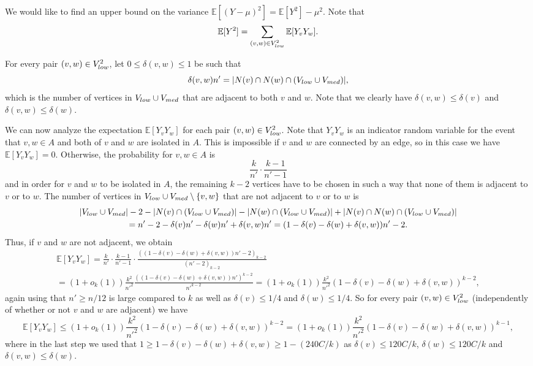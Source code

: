 \documentclass[11pt]{article}
\theoremstyle{definition}
\numberwithin{equation}{section}
\begin{document}
We would like to find an upper bound on the variance $\mathbb{E}[(Y-\mu)^2]=\mathbb{E}[Y^2]-\mu^2$. Note that
\[\mathbb{E}[Y^2]=\sum_{(v,w)\in V_{\textnormal{low}}^2}\mathbb{E}[Y_vY_w].\]

For every pair $(v,w)\in V_{\textnormal{low}}^2$, let $0\leq \delta(v,w)\leq 1$ be such that
\[\delta(v,w)n'=\vert N(v)\cap N(w)\cap (V_{\textnormal{low}}\cup V_{\textnormal{med}})\vert,\]
which is the number of vertices in $V_{\textnormal{low}}\cup V_{\textnormal{med}}$ that are adjacent to both $v$ and $w$. Note that we clearly have $\delta(v,w)\leq \delta(v)$ and $\delta(v,w)\leq \delta(w)$.

We can now analyze the expectation $\mathbb{E}[Y_vY_w]$ for each pair $(v,w)\in V_{\textnormal{low}}^2$. Note that $Y_vY_w$ is an indicator random variable for the event that $v,w\in A$ and both of $v$ and $w$ are isolated in $A$. This is impossible if $v$ and $w$ are connected by an edge, so in this case we have $\mathbb{E}[Y_vY_w]=0$. Otherwise, the probability for $v,w\in A$ is
\[\frac{k}{n'}\cdot \frac{k-1}{n'-1}\]
and in order for $v$ and $w$ to be isolated in $A$, the remaining $k-2$ vertices have to be chosen in such a way that none of them is adjacent to $v$ or to $w$. The number of vertices in $V_{\textnormal{low}}\cup V_{\textnormal{med}}\setminus \lbrace v,w\rbrace$ that are not adjacent to $v$ or to $w$ is
\begin{multline*}
\vert V_{\textnormal{low}}\cup V_{\textnormal{med}}\vert-2-\vert N(v)\cap (V_{\textnormal{low}}\cup V_{\textnormal{med}})\vert-\vert N(w)\cap (V_{\textnormal{low}}\cup V_{\textnormal{med}})\vert+\vert N(v)\cap N(w)\cap (V_{\textnormal{low}}\cup V_{\textnormal{med}})\vert\\
=n'-2-\delta(v)n'-\delta(w)n'+\delta(v,w)n'=(1-\delta(v)-\delta(w)+\delta(v,w))n'-2.
\end{multline*}
Thus, if $v$ and $w$ are not adjacent, we obtain
\begin{multline*}
\mathbb{E}[Y_vY_w]=\frac{k}{n'}\cdot \frac{k-1}{n'-1}\cdot \frac{((1-\delta(v)-\delta(w)+\delta(v,w))n'-2)_{k-2}}{(n'-2)_{k-2}}\\
=(1+o_k(1)) \frac{k^2}{n'^2}\frac{((1-\delta(v)-\delta(w)+\delta(v,w))n')^{k-2}}{n'^{k-2}}=(1+o_k(1)) \frac{k^2}{n'^2}(1-\delta(v)-\delta(w)+\delta(v,w))^{k-2},
\end{multline*}
again using that $n'\geq n/12$ is large compared to $k$ as well as $\delta(v)\leq 1/4$ and $\delta(w)\leq 1/4$. So for every pair $(v,w)\in V_{\textnormal{low}}^2$ (independently of whether or not $v$ and $w$ are adjacent) we have
\[\mathbb{E}[Y_vY_w]\leq (1+o_k(1))\frac{k^2}{n'^2}(1-\delta(v)-\delta(w)+\delta(v,w))^{k-2}=(1+o_k(1))\frac{k^2}{n'^2}(1-\delta(v)-\delta(w)+\delta(v,w))^{k-1},\]
where in the last step we used that $1\geq 1-\delta(v)-\delta(w)+\delta(v,w)\geq 1-(240C/k)$ as $\delta(v)\leq 120C/k$, $\delta(w)\leq 120C/k$ and $\delta(v,w)\leq \delta(w)$.
\end{document}
